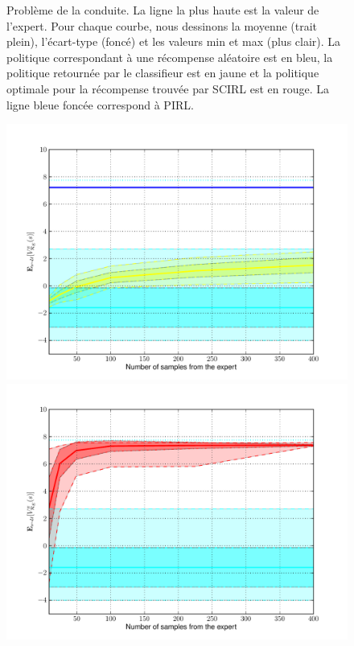 \documentclass[english,utf8]{./hermes-journal}
\begin{document}
\begin{figure}[fig:res]{Problème de la conduite. La ligne la plus haute est la valeur de l'expert. Pour chaque courbe, nous dessinons la moyenne (trait plein), l'écart-type (foncé) et les valeurs min et max (plus clair). La politique correspondant à une récompense aléatoire est en bleu, la politique retournée par le classifieur est en jaune et la politique optimale pour la récompense trouvée par SCIRL est en rouge. La ligne bleue foncée correspond à PIRL.}
\begin{minipage}[l]{0.49\linewidth}
\centering
  \centerline{\includegraphics[width=1.2\linewidth]{fig_classif.pdf}}
\end{minipage} \hfill
\begin{minipage}[r]{0.49\linewidth}
\centering
  \centerline{\includegraphics[width=1.2\linewidth]{fig_scirl.pdf}}
\end{minipage}
\end{figure}
\end{document}
